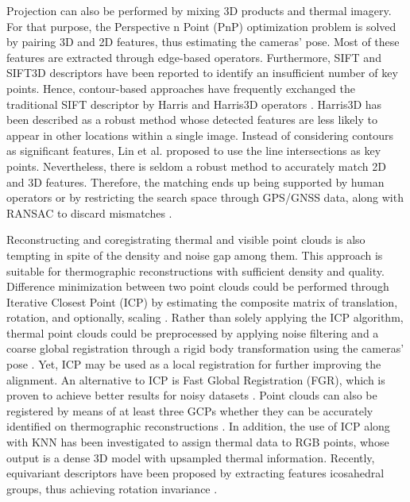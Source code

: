 Projection can also be performed by mixing 3D products and thermal imagery. For that purpose, the Perspective n Point (PnP) optimization problem is solved by pairing 3D and 2D features, thus estimating the cameras' pose. Most of these features are extracted through edge-based operators. Furthermore, SIFT and SIFT3D descriptors have been reported to identify an insufficient number of key points. Hence, contour-based approaches have frequently exchanged the traditional SIFT descriptor by Harris and Harris3D operators \cite{zhu_fusion_2021, zhu_direct_2019}. Harris3D has been described as a robust method whose detected features are less likely to appear in other locations within a single image. Instead of considering contours as significant features, Lin et al. \cite{lin_fusion_2019} proposed to use the line intersections as key points. Nevertheless, there is seldom a robust method to accurately match 2D and 3D features. Therefore, the matching ends up being supported by human operators \cite{zhu_fusion_2021, zhu_direct_2019} or by restricting the search space through GPS/GNSS data, along with RANSAC to discard mismatches \cite{lin_fusion_2019}. 

Reconstructing and coregistrating thermal and visible point clouds is also tempting in spite of the density and noise gap among them. This approach is suitable for thermographic reconstructions with sufficient density and quality. Difference minimization between two point clouds could be performed through Iterative Closest Point (ICP) by estimating the composite matrix of translation, rotation, and optionally, scaling \cite{hoegner_mobile_2018, webster_three-dimensional_2018, clarkson_thermal_2017}. Rather than solely applying the ICP algorithm, thermal point clouds could be preprocessed by applying noise filtering and a coarse global registration through a rigid body transformation using the cameras' pose \cite{truong_registration_2017}. Yet, ICP may be used as a local registration for further improving the alignment. An alternative to ICP is Fast Global Registration (FGR), which is proven to achieve better results for noisy datasets \cite{lin_fusion_2019}. Point clouds can also be registered by means of at least three GCPs whether they can be accurately identified on thermographic reconstructions \cite{dahaghin_3d_2019}. In addition, the use of ICP along with KNN has been investigated to assign thermal data to RGB points, whose output is a dense 3D model with upsampled thermal information. Recently, equivariant descriptors have been proposed by extracting features icosahedral groups, thus achieving rotation invariance \cite{wang_you_2022}.

